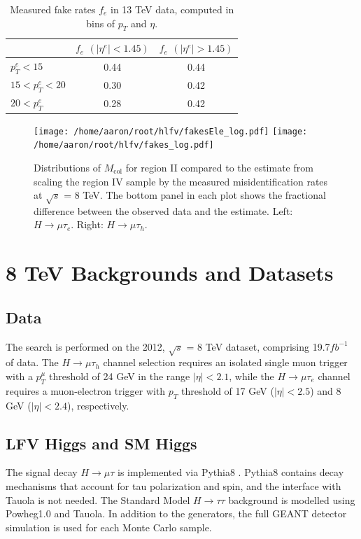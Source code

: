 \documentclass[oneside, letterpaper, oldfontcommands]{memoir}
\begin{document}
\begin{table}[htbp]
  \centering
  \begin{tabular}{ | l | c | c |}
    \hline
     & $f_{e}$ $\left(|\eta^{e}|<1.45\right)$ & $f_{e}$ $\left(|\eta^{e}|>1.45\right)$ \\ \hline \hline
    $p_{T}^{e} < 15$ & 0.44 & 0.44 \\ \hline
    $15< p_{T}^{e} < 20$& 0.30 & 0.42 \\ \hline
    $20< p_{T}^{e}$    & 0.28 & 0.42 \\ \hline

  \end{tabular}
  \caption{Measured fake rates $f_{e}$ in 13 TeV data, computed in bins of $p_{T}$ and $\eta$.}
  \label{tab:efakerate13TeV}
\end{table}


\begin{figure}[hbtp]\centering
\texttt{[image: /home/aaron/root/hlfv/fakesEle\_log.pdf]}
\texttt{[image: /home/aaron/root/hlfv/fakes\_log.pdf]}
\caption{Distributions of $M_\text{col}$ for region II compared to the estimate
from scaling the region IV sample by the measured misidentification rates at $\sqrt{s}$ = 8 TeV. The bottom panel in each plot shows the fractional difference between the observed data and the estimate. Left:  $H \rightarrow \mu \tau_{e}$. Right: $H \rightarrow \mu \tau_{h}$. }
\label{fig:samesign_fakes}\end{figure}


\section{8 TeV Backgrounds and Datasets}
\subsection{Data}
\qquad The search is performed on the 2012, $\sqrt{s}$ = 8 TeV dataset, comprising 19.7$fb^{-1}$ of data. The $H \rightarrow \mu\tau_{h}$ channel selection requires an isolated single muon trigger with a $p_{T}^{\mu}$ threshold of 24 GeV in the range $|\eta| < 2.1$, while the $H \rightarrow \mu\tau_{e}$ channel requires a muon-electron trigger with $p_{T}$ threshold of 17 GeV ($|\eta| < 2.5$) and 8 GeV ($|\eta| < 2.4$), respectively. 
\subsection{LFV Higgs and SM Higgs}
\qquad The signal decay $H \rightarrow \mu\tau$ is implemented via {\sc Pythia}8 \cite{Sjostrand:2014zea}. {\sc Pythia}8 contains decay mechanisms that account for tau polarization and spin, and the interface with {\sc Tauola}\cite{Was:2011tv} is not needed\cite{Sjostrand:2014zea}. The Standard Model $H \rightarrow \tau\tau$ background is modelled using {\sc Powheg}1.0\cite{Frixione:2007nu} and {\sc Tauola}. In addition to the generators, the full GEANT detector simulation is used for each Monte Carlo sample.
\end{document}
